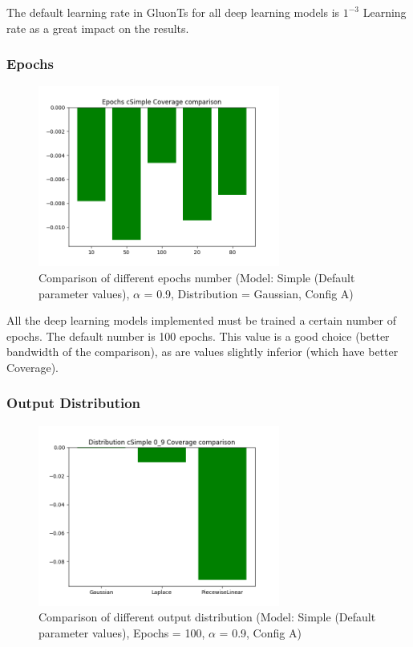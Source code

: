 The default learning rate in GluonTs for all deep learning models is $1^{-3}$
Learning rate as a great impact on the results.

\subsubsection{Epochs} \label{comp_epochs}

\begin{figure}[H]
    \centering
    \includegraphics[width=300px]{plots/hist/a/epochs/cSimple/Coverage.png}
    \caption{Comparison of different epochs number (Model: Simple (Default parameter values), $\alpha$ = 0.9, Distribution = Gaussian, Config A)}
    \label{fig:comp_epochs}
\end{figure}

All the deep learning models implemented must be trained a certain number of epochs. The default number 
is 100 epochs. This value is a good choice (better bandwidth of the comparison), as are values slightly  inferior (which have better Coverage). 

\newpage

\subsubsection{Output Distribution} \label{comp_outdistrib}

\begin{figure}[H]
    \centering
    \includegraphics[width=300px]{plots/hist/a/distribution/cSimple/0_9/Coverage.png}
    \caption{Comparison of different output distribution (Model: Simple (Default parameter values), Epochs = 100, $\alpha$ = 0.9,  Config A)}
    \label{fig:comp_outdistrib}
\end{figure}

